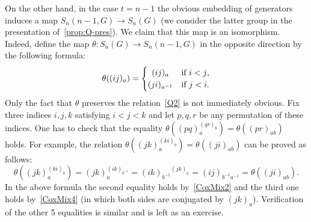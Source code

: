 \documentclass[oneside, 10pt]{amsart}
\theoremstyle{plain}
\numberwithin{equation}{section}
\numberwithin{lemma}{section}
\theoremstyle{remark}
\theoremstyle{definition}
\begin{document}
On the other hand, in the case $t=n-1$ the obvious embedding of generators induces a map $S_n(n-1,G) \to S_n(G)$ 
 (we consider the latter group in the presentation of~\cref{prop:Q-pres}).
We claim that this map is an isomorphism. Indeed, define the map $\theta\colon S_n(G) \to S_n(n-1, G)$ in the opposite direction by the following formula:
\[\theta((ij)_a) = \left\{\def\arraystretch{1.2}%
  \begin{array}{@{}c@{\quad}l@{}}
    (ij)_a & \text{if $i < j$,}\\
    (ji)_{a^{-1}} & \text{if $j < i$.}\\
  \end{array}\right.\]
Only the fact that $\theta$ preserves the relation~\eqref{Q2} is not immediately obvious.
Fix three indices $i,j,k$ satisfying $i<j<k$ and let $p,q,r$ be any permutation of these indices.
One has to check that the equality $\theta((pq)_a^{(qr)_b}) = \theta((pr)_{ab})$ holds.
For example, the relation $\theta((jk)_a^{(ki)_b}) = \theta((ji)_{ab})$ can be proved as follows:
\[ \theta((jk)_a^{(ki)_b}) = (jk)_a^{(ik)_{b^{-1}}} = {(ik)_{b^{-1}}}^{(jk)_a} = (ij)_{b^{-1}a^{-1}} = \theta((ji)_{ab}).\]
In the above formula the second equality holds by~\eqref{CoxMix2} and the third one holds by~\eqref{CoxMix4} (in which both sides are conjugated by $(jk)_a$).
Verification of the other 5 equalities is similar and is left as an exercise.
\end{document}
